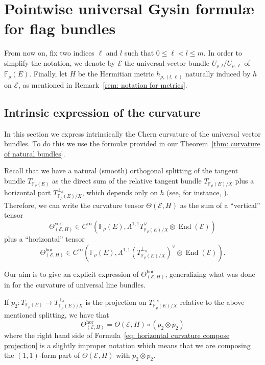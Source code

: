 \documentclass[a4paper]{amsart}
\theoremstyle{plain}%
\theoremstyle{definition}
\theoremstyle{remark}
\newcommand{\FF}{\mathbb{F}}
\begin{document}
\section{Pointwise universal Gysin formul{\ae} for flag bundles}
From now on, fix two indices $ \ell $ and $ l $ such that $ 0 \le \ell < l \le m $.
In order to simplify the notation, we denote by $ \mathcal{E} $ the universal vector bundle $ U_{\rho,l}/U_{\rho,\ell} $ of $ \FF_{\rho}(E) $.
Finally, let $ H $ be the Hermitian metric $ h_{\rho,(l,\ell)} $ naturally induced by $ h $ on $ \mathcal{E} $, as mentioned in Remark~\ref{rem: notation for metrics}.

\subsection{Intrinsic expression of the curvature}\label{sect: intrinsic curvature vector bundle}
In this section we express intrinsically the Chern curvature of the universal vector bundles.
To do this we use the formul{\ae} provided in our Theorem~\ref{thm: curvature of natural bundles}.

Recall that we have a natural (smooth) orthogonal splitting of the tangent bundle $ T_{\FF_{\rho}(E)} $ as the direct sum of the relative tangent bundle $ T_{\FF_{\rho}(E) / X} $ plus a horizontal part $ T_{\FF_{\rho}(E) / X}^{\perp_h} $, which depends only on $ h $ (see, for instance, \cite{DF20}).
Therefore, we can write the curvature tensor $ \Theta(\mathcal{E},H) $ as the sum of a {\textquotedblleft}{vertical}{\textquotedblright} tensor
\begin{equation*}
	\Theta_{(\mathcal{E},H)}^{\operatorname{vert}} \in C^{\infty} \left( \FF_{\rho}(E), \Lambda^{1,1}T_{\FF_{\rho}(E) / X}^{\vee} \otimes \operatorname{End}(\mathcal{E}) \right)
\end{equation*}
plus a {\textquotedblleft}{horizontal}{\textquotedblright} tensor
\begin{equation*}
	\Theta_{(\mathcal{E},H)}^{\operatorname{hor}} \in C^{\infty} \left( \FF_{\rho}(E), \Lambda^{1,1}(T_{\FF_{\rho}(E) / X}^{\perp_h})^{\vee} \otimes \operatorname{End}(\mathcal{E}) \right) .
\end{equation*}

Our aim is to give an explicit expression of $ \Theta_{(\mathcal{E},H)}^{\operatorname{hor}} $, generalizing what was done in \cite[Section~{2.1}]{DF20} for the curvature of universal line bundles.

If $ p_2 \colon T_{\FF_{\rho}(E)} \to T_{\FF_{\rho}(E)/X}^{\perp_h} $ is the projection on $ T_{\FF_{\rho}(E) / X}^{\perp_h} $ relative to the above mentioned splitting, we have that
\begin{equation}\label{eq: horizontal curvature compose projection}
	\Theta_{(\mathcal{E},H)}^{\operatorname{hor}} = \Theta(\mathcal{E},H) \circ (p_2 \otimes \bar{p}_2)
\end{equation}
where the right hand side of Formula~\eqref{eq: horizontal curvature compose projection} is a slightly improper notation which means that we are composing the $ (1,1) $-form part of $ \Theta(\mathcal{E},H) $ with $ p_2 \otimes \bar{p}_2 $.
\end{document}
